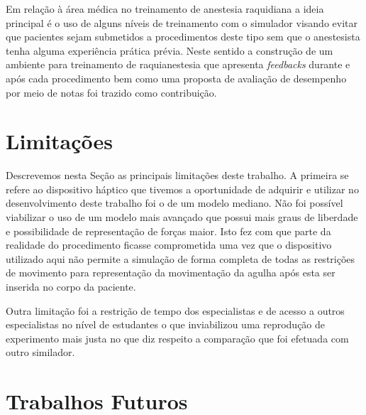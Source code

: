 Em relação à área médica no treinamento de anestesia raquidiana a ideia principal é o uso de alguns níveis de treinamento com o simulador visando evitar que pacientes sejam submetidos a procedimentos deste tipo sem que o anestesista tenha alguma experiência prática prévia. Neste sentido a construção de um ambiente para treinamento de raquianestesia que apresenta \textit{feedbacks} durante e após cada procedimento bem como uma proposta de avaliação de desempenho por meio de notas foi trazido como contribuição. 

\section{Limitações}

Descrevemos nesta Seção as principais limitações deste trabalho. A primeira se refere ao dispositivo háptico que tivemos a oportunidade de adquirir e utilizar no desenvolvimento deste trabalho foi o de um modelo mediano. Não foi possível viabilizar o uso de um modelo mais avançado que possui mais graus de liberdade e possibilidade de representação de forças maior. Isto fez com que parte da realidade do procedimento ficasse comprometida uma vez que o dispositivo utilizado aqui não permite a simulação de forma completa de todas as restrições de movimento para representação da movimentação da agulha após esta ser inserida no corpo da paciente.

Outra limitação foi a restrição de tempo dos especialistas e de acesso a outros especialistas no nível de estudantes o que inviabilizou uma reprodução de experimento mais justa no que diz respeito a comparação que foi efetuada com outro similador.  

\section{Trabalhos Futuros}
\label{sec:trabFuturo}

